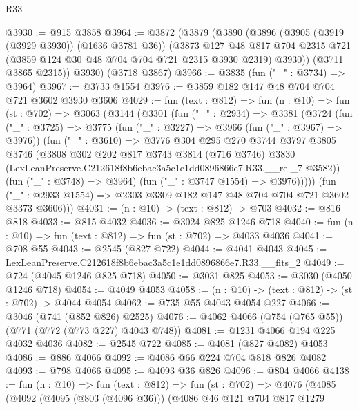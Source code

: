 \begin{lexlean}{R33}
\begin{coremodule}
@3930 := @915 @3858
@3964 := @3872
    (@3879
      (@3890
        (@3896
          (@3905 (@3919 (@3929 @3930)) (@1636 @3781 @36))
          (@3873
            @127
            @48
            @817
            @704
            @2315
            @721
            (@3859 @124 @30 @48 @704 @704 @721 @2315 @3930 @2319)
            @3930))
        (@3711 @3865 @2315))
      @3930)
    (@3718 @3867)
@3966 := @3835 (fun ("_" : @3734) => @3964)
@3967 := @3733 @1554
@3976 := @3859 @182 @147 @48 @704 @704 @721 @3602 @3930 @3606
@4029 := fun (text : @812) =>
  fun (n : @10) =>
  fun (st : @702) =>
  @3063
    (@3144
      (@3301
        (fun ("_" : @2934) =>
        @3381
          (@3724
            (fun ("_" : @3725) =>
            @3775
              (fun ("_" : @3227) => @3966 (fun ("_" : @3967) => @3976))
              (fun ("_" : @3610) =>
              @3776
                @304
                @295
                @270
                @3744
                @3797
                @3805
                @3746
                (@3808
                  @302
                  @202
                  @817
                  @3743
                  @3814
                  (@716 @3746)
                  @3830
                  (LexLeanPreserve.C212618f8b6ebac3a5c1e1dd0896866e7.R33.__rel_7 @3582))
                (fun ("_" : @3748) => @3964)
                (fun ("_" : @3747 @1554) => @3976)))))
        (fun ("_" : @2933 @1554) => @2303 @3309 @182 @147 @48 @704 @704 @721 @3602 @3373 @3606)))
@4031 := (n : @10) -> (text : @812) -> @703
@4032 := @816 @818
@4033 := @815 @4032
@4036 := @3024 @825 @1246 @718
@4040 := fun (n : @10) => fun (text : @812) => fun (st : @702) => @4033 @4036
@4041 := @708 @55
@4043 := @2545 (@827 @722)
@4044 := @4041 @4043
@4045 := LexLeanPreserve.C212618f8b6ebac3a5c1e1dd0896866e7.R33.__fits_2
@4049 := @724 (@4045 @1246 @825 @718)
@4050 := @3031 @825
@4053 := @3030 (@4050 @1246 @718)
@4054 := @4049 @4053
@4058 := (n : @10) -> (text : @812) -> (st : @702) -> @4044 @4054
@4062 := @735 @55 @4043 @4054 @227
@4066 := @3046 (@741 (@852 @826) @2525)
@4076 := @4062 @4066 (@754 (@765 @55)) (@771 (@772 (@773 @227) @4043 @748))
@4081 := @1231 @4066 @194 @225 @4032 @4036
@4082 := @2545 @722
@4085 := @4081 (@827 @4082) @4053
@4086 := @886 @4066
@4092 := @4086 @66 @224 @704 @818 @826 @4082
@4093 := @798 @4066
@4095 := @4093 @36 @826
@4096 := @804 @4066
@4138 := fun (n : @10) =>
  fun (text : @812) =>
  fun (st : @702) =>
  @4076
    (@4085
      (@4092
        (@4095 (@803 (@4096 @36)))
        (@4086
          @46
          @121
          @704
          @817
          @1279

\end{coremodule}
\end{lexlean}
